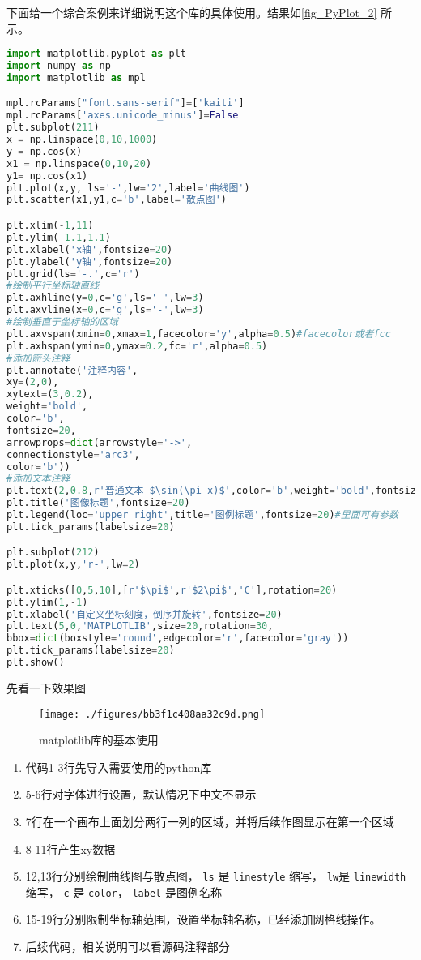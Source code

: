 下面给一个综合案例来详细说明这个库的具体使用。结果如\autoref{fig_PyPlot_2} 所示。
\begin{lstlisting}[language=python]
import matplotlib.pyplot as plt
import numpy as np
import matplotlib as mpl

mpl.rcParams["font.sans-serif"]=['kaiti']
mpl.rcParams['axes.unicode_minus']=False
plt.subplot(211)
x = np.linspace(0,10,1000)
y = np.cos(x)
x1 = np.linspace(0,10,20)
y1= np.cos(x1)
plt.plot(x,y, ls='-',lw='2',label='曲线图')
plt.scatter(x1,y1,c='b',label='散点图')

plt.xlim(-1,11)
plt.ylim(-1.1,1.1)
plt.xlabel('x轴',fontsize=20)
plt.ylabel('y轴',fontsize=20)
plt.grid(ls='-.',c='r')
#绘制平行坐标轴直线
plt.axhline(y=0,c='g',ls='-',lw=3)
plt.axvline(x=0,c='g',ls='-',lw=3)
#绘制垂直于坐标轴的区域
plt.axvspan(xmin=0,xmax=1,facecolor='y',alpha=0.5)#facecolor或者fcc
plt.axhspan(ymin=0,ymax=0.2,fc='r',alpha=0.5)
#添加箭头注释
plt.annotate('注释内容',
xy=(2,0),
xytext=(3,0.2),
weight='bold',
color='b',
fontsize=20,
arrowprops=dict(arrowstyle='->',
connectionstyle='arc3',
color='b'))
#添加文本注释
plt.text(2,0.8,r'普通文本 $\sin(\pi x)$',color='b',weight='bold',fontsize=20)
plt.title('图像标题',fontsize=20)
plt.legend(loc='upper right',title='图例标题',fontsize=20)#里面可有参数
plt.tick_params(labelsize=20)

plt.subplot(212)
plt.plot(x,y,'r-',lw=2)

plt.xticks([0,5,10],[r'$\pi$',r'$2\pi$','C'],rotation=20)
plt.ylim(1,-1)
plt.xlabel('自定义坐标刻度，倒序并旋转',fontsize=20)
plt.text(5,0,'MATPLOTLIB',size=20,rotation=30,
bbox=dict(boxstyle='round',edgecolor='r',facecolor='gray'))
plt.tick_params(labelsize=20)
plt.show()
\end{lstlisting}
先看一下效果图

\begin{figure}[ht]
\centering
\texttt{[image: ./figures/bb3f1c408aa32c9d.png]}
\caption{matplotlib库的基本使用} \label{fig_PyPlot_2}
\end{figure}

\begin{enumerate}
\item 代码1-3行先导入需要使用的python库
\item 5-6行对字体进行设置，默认情况下中文不显示
\item 7行在一个画布上面划分两行一列的区域，并将后续作图显示在第一个区域
\item 8-11行产生xy数据
\item 12,13行分别绘制曲线图与散点图， \verb`ls` 是 \verb`linestyle` 缩写， \verb`lw`是 \verb`linewidth` 缩写， \verb`c` 是 \verb`color`， \verb`label` 是图例名称
\item 15-19行分别限制坐标轴范围，设置坐标轴名称，已经添加网格线操作。
\item 后续代码，相关说明可以看源码注释部分
\end{enumerate}

